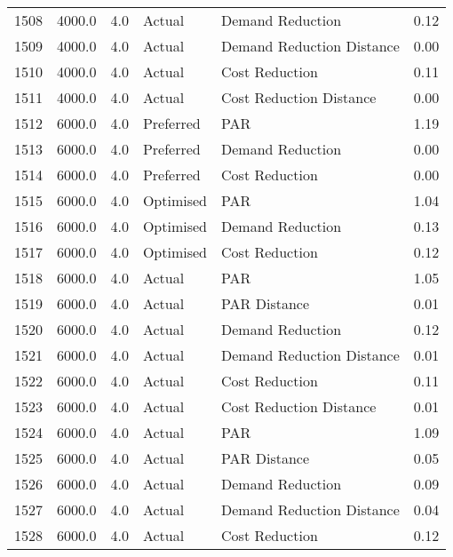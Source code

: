 \begin{longtable}{lrrllr}
1508 &       4000.0 &     4.0 &         Actual &           Demand Reduction &   0.12 \\
1509 &       4000.0 &     4.0 &         Actual &  Demand Reduction Distance &   0.00 \\
1510 &       4000.0 &     4.0 &         Actual &             Cost Reduction &   0.11 \\
1511 &       4000.0 &     4.0 &         Actual &    Cost Reduction Distance &   0.00 \\
1512 &       6000.0 &     4.0 &      Preferred &                        PAR &   1.19 \\
1513 &       6000.0 &     4.0 &      Preferred &           Demand Reduction &   0.00 \\
1514 &       6000.0 &     4.0 &      Preferred &             Cost Reduction &   0.00 \\
1515 &       6000.0 &     4.0 &      Optimised &                        PAR &   1.04 \\
1516 &       6000.0 &     4.0 &      Optimised &           Demand Reduction &   0.13 \\
1517 &       6000.0 &     4.0 &      Optimised &             Cost Reduction &   0.12 \\
1518 &       6000.0 &     4.0 &         Actual &                        PAR &   1.05 \\
1519 &       6000.0 &     4.0 &         Actual &               PAR Distance &   0.01 \\
1520 &       6000.0 &     4.0 &         Actual &           Demand Reduction &   0.12 \\
1521 &       6000.0 &     4.0 &         Actual &  Demand Reduction Distance &   0.01 \\
1522 &       6000.0 &     4.0 &         Actual &             Cost Reduction &   0.11 \\
1523 &       6000.0 &     4.0 &         Actual &    Cost Reduction Distance &   0.01 \\
1524 &       6000.0 &     4.0 &         Actual &                        PAR &   1.09 \\
1525 &       6000.0 &     4.0 &         Actual &               PAR Distance &   0.05 \\
1526 &       6000.0 &     4.0 &         Actual &           Demand Reduction &   0.09 \\
1527 &       6000.0 &     4.0 &         Actual &  Demand Reduction Distance &   0.04 \\
1528 &       6000.0 &     4.0 &         Actual &             Cost Reduction &   0.12 \\

\end{longtable}
